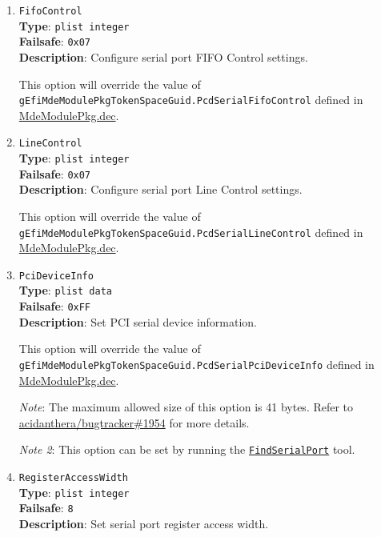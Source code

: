 \documentclass[]{article}
\begin{document}
\begin{enumerate}
\item
  \texttt{FifoControl}\\
  \textbf{Type}: \texttt{plist\ integer}\\
  \textbf{Failsafe}: \texttt{0x07}\\
  \textbf{Description}: Configure serial port FIFO Control settings.

  This option will override the value of \texttt{gEfiMdeModulePkgTokenSpaceGuid.PcdSerialFifoControl}
  defined in \href{https://github.com/acidanthera/audk/blob/master/MdeModulePkg/MdeModulePkg.dec}{MdeModulePkg.dec}.

\item
  \texttt{LineControl}\\
  \textbf{Type}: \texttt{plist\ integer}\\
  \textbf{Failsafe}: \texttt{0x07}\\
  \textbf{Description}: Configure serial port Line Control settings.

  This option will override the value of \texttt{gEfiMdeModulePkgTokenSpaceGuid.PcdSerialLineControl}
  defined in \href{https://github.com/acidanthera/audk/blob/master/MdeModulePkg/MdeModulePkg.dec}{MdeModulePkg.dec}.

\item
  \texttt{PciDeviceInfo}\\
  \textbf{Type}: \texttt{plist\ data}\\
  \textbf{Failsafe}: \texttt{0xFF}\\
  \textbf{Description}: Set PCI serial device information.

  This option will override the value of \texttt{gEfiMdeModulePkgTokenSpaceGuid.PcdSerialPciDeviceInfo}
  defined in \href{https://github.com/acidanthera/audk/blob/master/MdeModulePkg/MdeModulePkg.dec}{MdeModulePkg.dec}.

  \emph{Note}: The maximum allowed size of this option is 41 bytes. Refer to
  \href{https://github.com/acidanthera/bugtracker/issues/1954#issuecomment-1084220743}{acidanthera/bugtracker\#1954}
  for more details.

  \emph{Note 2}: This option can be set by running the
  \href{https://github.com/acidanthera/OpenCorePkg/tree/master/Utilities/FindSerialPort}{\texttt{FindSerialPort}} tool.

\item
  \texttt{RegisterAccessWidth}\\
  \textbf{Type}: \texttt{plist\ integer}\\
  \textbf{Failsafe}: \texttt{8}\\
  \textbf{Description}: Set serial port register access width.


\end{enumerate}
\end{document}
